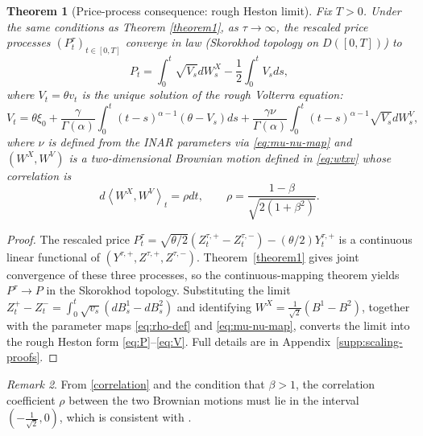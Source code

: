 \documentclass[letterpaper]{article}
\numberwithin{equation}{section}
\newtheorem{theorem}{Theorem}[section]
\theoremstyle{definition}
\theoremstyle{remark}
\newtheorem{remark}[theorem]{Remark}
\begin{document}
\begin{theorem}[Price-process consequence: rough Heston limit]\label{maintheorem}
  Fix $T>0$. Under the same conditions as Theorem \ref{theorem1}, as $\tau\to\infty$, the rescaled price processes $(P_t^{\tau})_{t\in[0,T]}$ converge in law (Skorokhod topology on $D([0,T])$) to
  \begin{equation}\label{eq:P}
    P_t=\int_0^t\sqrt{V_s}dW_s^X-\frac12\int_0^tV_sds,
  \end{equation}
  where $V_t=\theta v_t$ is the unique solution of the rough Volterra equation:
  \begin{equation}\label{eq:V}
    V_t=\theta\xi_0+\frac{\gamma}{\Gamma(\alpha)}\int_0^t (t-s)^{\alpha-1}\left(\theta-V_s\right)ds
    +\frac{\gamma\nu}{\Gamma(\alpha)}\int_0^t (t-s)^{\alpha-1}\sqrt{V_s}dW_s^V,
  \end{equation}
  where $\nu$ is defined from the INAR parameters via \eqref{eq:mu-nu-map} and $\left(W^X,W^V\right)$ is a two-dimensional Brownian motion defined in \eqref{eq:wtxv} whose correlation is
\begin{equation}\label{correlation}
    d\left\langle W^X,W^V\right\rangle_t=\rho dt,\qquad
    \rho=\frac{1-\beta}{\sqrt{2(1+\beta^2)}}.
  \end{equation}
\end{theorem}

\begin{proof}
{The rescaled price $P_t^\tau=\sqrt{\theta/2}(Z_t^{\tau,+}-Z_t^{\tau,-})-(\theta/2)Y_t^{\tau,+}$ is a continuous linear functional of $(Y^{\tau,+},Z^{\tau,+},Z^{\tau,-})$. Theorem~\ref{theorem1} gives joint convergence of these three processes, so the continuous-mapping theorem yields $P^\tau\to P$ in the Skorokhod topology. Substituting the limit $Z^+_t-Z^-_t=\int_0^t\sqrt{v_s}(dB^1_s-dB^2_s)$ and identifying $W^X=\frac{1}{\sqrt{2}}(B^1-B^2)$, together with the parameter maps \eqref{eq:rho-def} and \eqref{eq:mu-nu-map}, converts the limit into the rough Heston form \eqref{eq:P}--\eqref{eq:V}.} Full details are in Appendix~\ref{supp:scaling-proofs}.
\end{proof}

\begin{remark}
   From \eqref{correlation} and the condition that $\beta > 1$, the correlation coefficient $\rho$ between the two Brownian motions must lie in the interval $\left(-\frac{1}{\sqrt{2}}, 0\right)$, which is consistent with \cite{el2019characteristic}.
\end{remark}
\end{document}
